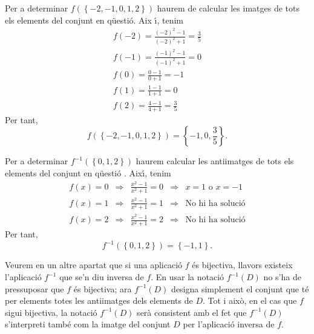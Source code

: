 \begin{solucio}
Per a determinar $f\left( \left\{ -2,-1,0,1,2\right\} \right) $ haurem de
calcular les imatges de tots els elements del conjunt en q\"{u}esti\'{o}. Aix%
\'{\i}, tenim%
\begin{equation*}
\begin{array}{c}
f(-2)=\frac{(-2)^{2}-1}{(-2)^{2}+1}=\frac{3}{5} \\
f(-1)=\frac{(-1)^{2}-1}{(-1)^{2}+1}=0 \\
f(0)=\frac{0-1}{0+1}=-1 \\
f(1)=\frac{1-1}{1+1}=0 \\
f(2)=\frac{4-1}{4+1}=\frac{3}{5}%
\end{array}
\end{equation*}
Per tant,%
\begin{equation*}
f\left( \left\{ -2,-1,0,1,2\right\} \right) =\left\{ -1,0,\frac{3}{5}%
\right\} \text{.}
\end{equation*}

Per a determinar $f^{-1}\left( \left\{ 0,1,2\right\} \right) $ haurem
calcular les antiimatges de tots els elements del conjunt en q\"{u}esti\'{o}%
. Aix\'{\i}, tenim%
\begin{equation*}
\begin{array}{ccccc}
f(x)=0 & \Longrightarrow & \frac{x^{2}-1}{x^{2}+1}=0 & \Longrightarrow & x=1%
\text{ o }x=-1 \\
f(x)=1 & \Longrightarrow & \frac{x^{2}-1}{x^{2}+1}=1 & \Longrightarrow &
\text{No hi ha soluci\'{o}} \\
f(x)=2 & \Longrightarrow & \frac{x^{2}-1}{x^{2}+1}=2 & \Longrightarrow &
\text{No hi ha soluci\'{o}}%
\end{array}
\end{equation*}
Per tant,%
\begin{equation*}
f^{-1}\left( \left\{ 0,1,2\right\} \right) =\left\{ -1,1\right\} \text{.}
\end{equation*}
\end{solucio}

\begin{obs}
Veurem en un altre apartat que si una aplicaci\'{o} $f$ \'{e}s bijectiva,
llavors existeix l'aplicaci\'{o} $f^{-1}$ que se'n diu inversa de $f$. En
usar la notaci\'{o} $f^{-1}(D)$ no s'ha de pressuposar que $f$ \'{e}s
bijectiva; ara $f^{-1}(D)$ designa simplement el conjunt que t\'{e} per
elements totes les antiimatges dels elements de $D$. Tot i aix\`{o}, en el
cas que $f$ sigui bijectiva, la notaci\'{o} $f^{-1}(D)$ ser\`{a} consistent
amb el fet que $f^{-1}(D)$ s'interpreti tamb\'{e} com la imatge del conjunt $%
D$ per l'aplicaci\'{o} inversa de $f$.
\end{obs}

